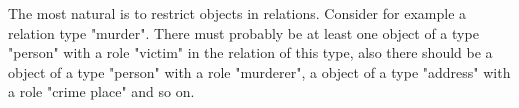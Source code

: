The most natural is to restrict objects in relations. Consider for example a relation
type "murder". There must probably be at least one object of a type "person" with
a role "victim" in the relation of this type, also there should be a object of
a type "person" with a role "murderer", a object of  a type "address" with a role
"crime place" and so on.
